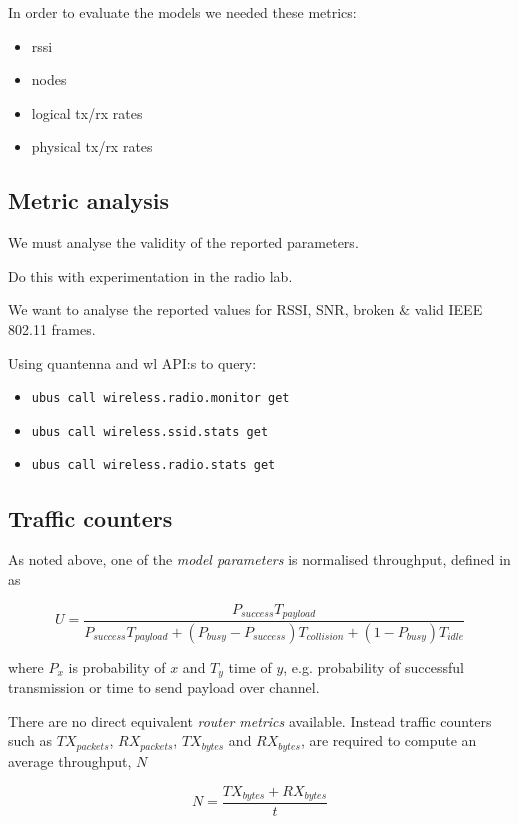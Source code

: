 In order to evaluate the models we needed these metrics:

\begin{itemize}
\item rssi
\item nodes
\item logical tx/rx rates
\item physical tx/rx rates
\end{itemize}

\subsection{Metric analysis}

We must analyse the validity of the reported parameters.

Do this with experimentation in the radio lab.

We want to analyse the reported values for RSSI, SNR, broken \& valid IEEE
802.11 frames.

Using quantenna and wl API:s to query:
\begin{itemize}
    \item \texttt{ubus call wireless.radio.monitor get}
    \item \texttt{ubus call wireless.ssid.stats get}
    \item \texttt{ubus call wireless.radio.stats get}
\end{itemize}

\subsection{Traffic counters}

As noted above, one of the \emph{model parameters} is normalised throughput,
defined in \cite{felemban} as

\begin{equation}
U = \frac{P_{success}T_{payload}}{P_{success}T_{payload} + (P_{busy} -
P_{success})T_{collision} + (1 - P_{busy})T_{idle}}
\end{equation}

where $P_x$ is probability of $x$ and $T_y$ time of $y$, e.g. probability of successful transmission or time to send payload over channel.

There are no direct equivalent \emph{router metrics} available. Instead traffic counters such as $TX_{packets}$,
$RX_{packets}$, $TX_{bytes}$ and $RX_{bytes}$, are required to compute an average throughput, $N$

\begin{equation}
N = \frac{TX_{bytes} + RX_{bytes}}{t}
\end{equation}

